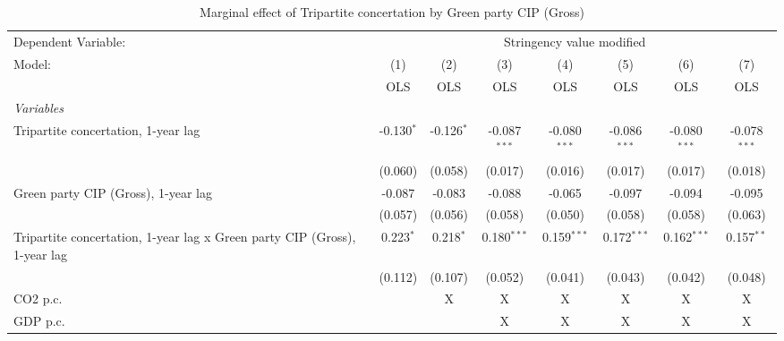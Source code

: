 
\begin{table}[htbp]
   \caption{Marginal effect of Tripartite concertation by Green party CIP (Gross)}
   \centering
   \begin{tabular}{lccccccc}
      \toprule
      Dependent Variable: & \multicolumn{7}{c}{Stringency value modified}\\
      Model:                                                                    & (1)          & (2)          & (3)            & (4)            & (5)            & (6)            & (7)\\  
                                                                                &  OLS         & OLS          & OLS            & OLS            & OLS            & OLS            & OLS\\  
      \midrule
      \emph{Variables}\\
      Tripartite concertation, 1-year lag                                       & -0.130$^{*}$ & -0.126$^{*}$ & -0.087$^{***}$ & -0.080$^{***}$ & -0.086$^{***}$ & -0.080$^{***}$ & -0.078$^{***}$\\   
                                                                                & (0.060)      & (0.058)      & (0.017)        & (0.016)        & (0.017)        & (0.017)        & (0.018)\\   
      Green party CIP (Gross), 1-year lag                                       & -0.087       & -0.083       & -0.088         & -0.065         & -0.097         & -0.094         & -0.095\\   
                                                                                & (0.057)      & (0.056)      & (0.058)        & (0.050)        & (0.058)        & (0.058)        & (0.063)\\   
      Tripartite concertation, 1-year lag x Green party CIP (Gross), 1-year lag & 0.223$^{*}$  & 0.218$^{*}$  & 0.180$^{***}$  & 0.159$^{***}$  & 0.172$^{***}$  & 0.162$^{***}$  & 0.157$^{**}$\\   
                                                                                & (0.112)      & (0.107)      & (0.052)        & (0.041)        & (0.043)        & (0.042)        & (0.048)\\   
      CO2 p.c.                                                                  &              & X            & X              & X              & X              & X              & X\\  
      GDP p.c.                                                                  &              &              & X              & X              & X              & X              & X\\  

\end{tabular}
\end{table}
